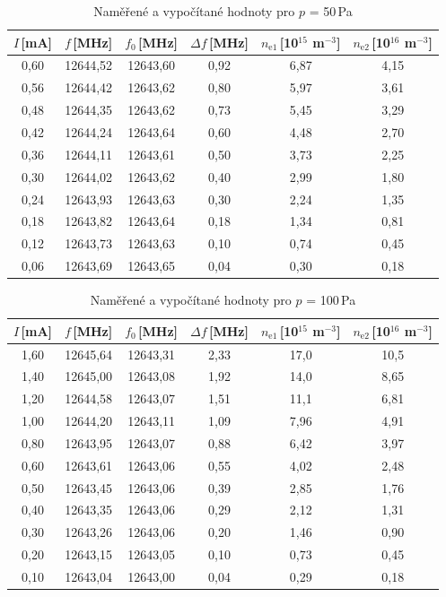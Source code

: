 \documentclass[12pt]{article}
\begin{document}
\begin{table}[htbp]
\begin{center}
\begin{tabular}{|c|c|c|c|c|c|}
\hline
$I$\,[mA] & $f$\,[MHz] & $f_0$\,[MHz] & $\Delta f$\,[MHz] & $n_\mathrm{e1}$\,[10$^{15}$ m$^{-3}$] & $n_\mathrm{e2}$\,[10$^{16}$ m$^{-3}$] \\ \hline \hline
0,60 & 12644,52 & 12643,60 & 0,92 & 6,87 & 4,15 \\ \hline
0,56 & 12644,42 & 12643,62 & 0,80 & 5,97 & 3,61 \\ \hline
0,48 & 12644,35 & 12643,62 & 0,73 & 5,45 & 3,29 \\ \hline
0,42 & 12644,24 & 12643,64 & 0,60 & 4,48 & 2,70 \\ \hline
0,36 & 12644,11 & 12643,61 & 0,50 & 3,73 & 2,25 \\ \hline
0,30 & 12644,02 & 12643,62 & 0,40 & 2,99 & 1,80 \\ \hline
0,24 & 12643,93 & 12643,63 & 0,30 & 2,24 & 1,35 \\ \hline
0,18 & 12643,82 & 12643,64 & 0,18 & 1,34 & 0,81 \\ \hline
0,12 & 12643,73 & 12643,63 & 0,10 & 0,74 & 0,45 \\ \hline
0,06 & 12643,69 & 12643,65 & 0,04 & 0,30 & 0,18 \\ \hline
\end{tabular}
\end{center}
\caption{Naměřené a vypočítané hodnoty pro $p$ = 50\,Pa}
\label{p50}
\end{table}


\begin{table}[htbp]
\begin{center}
\begin{tabular}{|c|c|c|c|c|c|}
\hline
$I$\,[mA] & $f$\,[MHz] & $f_0$\,[MHz] & $\Delta f$\,[MHz] & $n_\mathrm{e1}$\,[10$^{15}$ m$^{-3}$] & $n_\mathrm{e2}$\,[10$^{16}$ m$^{-3}$] \\ \hline \hline
1,60 & 12645,64 & 12643,31 & 2,33 & 17,0 & 10,5 \\ \hline
1,40 & 12645,00 & 12643,08 & 1,92 & 14,0 & 8,65 \\ \hline
1,20 & 12644,58 & 12643,07 & 1,51 & 11,1 & 6,81 \\ \hline
1,00 & 12644,20 & 12643,11 & 1,09 & 7,96 & 4,91 \\ \hline
0,80 & 12643,95 & 12643,07 & 0,88 & 6,42 & 3,97 \\ \hline
0,60 & 12643,61 & 12643,06 & 0,55 & 4,02 & 2,48 \\ \hline
0,50 & 12643,45 & 12643,06 & 0,39 & 2,85 & 1,76 \\ \hline
0,40 & 12643,35 & 12643,06 & 0,29 & 2,12 & 1,31 \\ \hline
0,30 & 12643,26 & 12643,06 & 0,20 & 1,46 & 0,90 \\ \hline
0,20 & 12643,15 & 12643,05 & 0,10 & 0,73 & 0,45 \\ \hline
0,10 & 12643,04 & 12643,00 & 0,04 & 0,29 & 0,18 \\ \hline
\end{tabular}
\caption{Naměřené a vypočítané hodnoty pro $p$ = 100\,Pa}
\label{p100}
\end{center}
\end{table}
\end{document}
